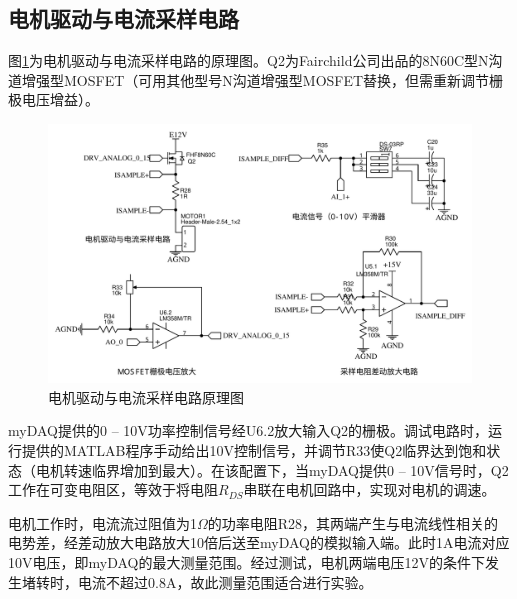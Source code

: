\documentclass[11pt,a4paper]{article}
\begin{document}
\subsection{电机驱动与电流采样电路}
图\ref{motor_mosfet_sch}为电机驱动与电流采样电路的原理图。Q2为Fairchild公司出品的8N60C型N沟道增强型MOSFET（可用其他型号N沟道增强型MOSFET替换，但需重新调节栅极电压增益）。
\begin{figure}[h!]\centering
  \includegraphics[width=14cm]{./figs/motor_mosfet_sch.pdf}
  \caption{电机驱动与电流采样电路原理图}\label{motor_mosfet_sch}
\end{figure}

myDAQ提供的0 -- 10V功率控制信号经U6.2放大输入Q2的栅极。调试电路时，运行提供的MATLAB程序手动给出10V控制信号，并调节R33使Q2临界达到饱和状态（电机转速临界增加到最大）。在该配置下，当myDAQ提供0 -- 10V信号时，Q2工作在可变电阻区，等效于将电阻$R_{DS}$串联在电机回路中，实现对电机的调速。

电机工作时，电流流过阻值为1$\Omega$的功率电阻R28，其两端产生与电流线性相关的电势差，经差动放大电路放大10倍后送至myDAQ的模拟输入端。此时1A电流对应10V电压，即myDAQ的最大测量范围。经过测试，电机两端电压12V的条件下发生堵转时，电流不超过0.8A，故此测量范围适合进行实验。
\end{document}
